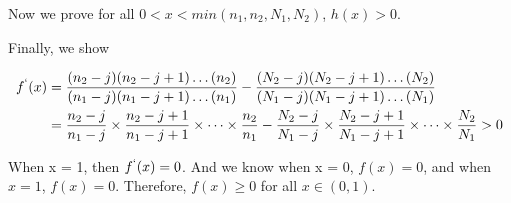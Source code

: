 \documentclass[12pt]{article}
\DeclareMathOperator*{\Prob}{P}
\begin{document}
Now we prove for all $0 < x < min(n_1, n_2, N_1, N_2)$, $h(x) > 0$. 

Finally, we show 

\begin{align*}
	f^{`}(x) &= \frac{(n_2 - j)(n_2 - j +1)\dots(n_2)}{(n_1 - j)(n_1 - j +1)\dots(n_1)} - \frac{(N_2 - j)(N_2 - j +1)\dots(N_2)}{(N_1 - j)(N_1 - j +1)\dots(N_1)}\\
	&= \frac{n_2 - j}{n_1 - j}\times\frac{n_2 - j+1}{n_1 - j+1}\times\dots\times\frac{n_2}{n_1} - \frac{N_2 - j}{N_1 - j}\times\frac{N_2 - j+1}{N_1 - j+1}\times\dots\times\frac{N_2}{N_1} > 0
\end{align*}

When x = 1, then $f^{`}(x) = 0$. And we know when x = 0, $f(x) = 0$, and when $x = 1$, $f(x) = 0$. Therefore, $f(x) \geq 0$ for all $x \in (0,1)$.

\end{document}
